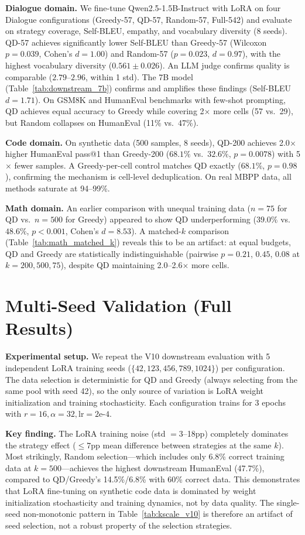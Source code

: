 \documentclass{article}
\begin{document}
\begin{enumerate}[nosep]
\textbf{Dialogue domain.}
We fine-tune Qwen2.5-1.5B-Instruct with LoRA on four Dialogue configurations (Greedy-57, QD-57, Random-57, Full-542) and evaluate on strategy coverage, Self-BLEU, empathy, and vocabulary diversity (8 seeds).
QD-57 achieves significantly lower Self-BLEU than Greedy-57 (Wilcoxon $p{=}0.039$, Cohen's $d{=}1.00$) and Random-57 ($p{=}0.023$, $d{=}0.97$), with the highest vocabulary diversity ($0.561 \pm 0.026$).
An LLM judge confirms quality is comparable ($2.79$--$2.96$, within 1 std).
The 7B model (Table~\ref{tab:downstream_7b}) confirms and amplifies these findings (Self-BLEU $d{=}1.71$).
On GSM8K and HumanEval benchmarks with few-shot prompting, QD achieves equal accuracy to Greedy while covering 2$\times$ more cells (57 vs.\ 29), but Random collapses on HumanEval (11\% vs.\ 47\%).

\textbf{Code domain.}
On synthetic data (500 samples, 8 seeds), QD-200 achieves 2.0$\times$ higher HumanEval pass@1 than Greedy-200 ($68.1\%$ vs.\ $32.6\%$, $p{=}0.0078$) with 5$\times$ fewer samples.
A Greedy-per-cell control matches QD exactly ($68.1\%$, $p{=}0.98$), confirming the mechanism is cell-level deduplication.
On real MBPP data, all methods saturate at 94--99\%.

\textbf{Math domain.}
An earlier comparison with unequal training data ($n{=}75$ for QD vs.\ $n{=}500$ for Greedy) appeared to show QD underperforming ($39.0\%$ vs.\ $48.6\%$, $p{<}0.001$, Cohen's $d{=}8.53$).
A matched-$k$ comparison (Table~\ref{tab:math_matched_k}) reveals this to be an artifact: at equal budgets, QD and Greedy are statistically indistinguishable (pairwise $p{=}0.21$, $0.45$, $0.08$ at $k{=}200,500,75$), despite QD maintaining 2.0--2.6$\times$ more cells.

\section{Multi-Seed Validation (Full Results)}
\label{sec:app_multiseed}

\textbf{Experimental setup.}
We repeat the V10 downstream evaluation with 5 independent LoRA training seeds ($\{42, 123, 456, 789, 1024\}$) per configuration.
The data selection is deterministic for QD and Greedy (always selecting from the same pool with seed 42), so the only source of variation is LoRA weight initialization and training stochasticity.
Each configuration trains for 3 epochs with $r{=}16, \alpha{=}32, \text{lr}{=}2\text{e-}4$.

\textbf{Key finding.}
The LoRA training noise (std $= 3$--18pp) completely dominates the strategy effect (${\leq}7$pp mean difference between strategies at the same $k$).
Most strikingly, Random selection---which includes only 6.8\% correct training data at $k{=}500$---achieves the highest downstream HumanEval (47.7\%), compared to QD/Greedy's 14.5\%/6.8\% with 60\% correct data.
This demonstrates that LoRA fine-tuning on synthetic code data is dominated by weight initialization stochasticity and training dynamics, not by data quality.
The single-seed non-monotonic pattern in Table~\ref{tab:kscale_v10} is therefore an artifact of seed selection, not a robust property of the selection strategies.


\end{enumerate}
\end{document}
